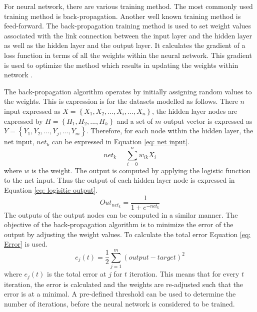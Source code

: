 \documentclass[11pt,twocolumn]{witseiepaper}
\begin{document}
	For neural network, there are various training method. The most commonly used training method is back-propagation. Another well known training method is feed-forward. The back-propagation training method is used to set weight values associated with the link connection between the input layer and the hidden layer as well as the hidden layer and the output layer. It calculates the gradient of a loss function in terms of all the weights within the neural network. This gradient is used to optimize the method which results in updating the weights within network \cite{Oukrich2016}.
	
	The back-propagation algorithm operates by initially assigning random values to the weights. This is expression is for the datasets modelled as follows. There $n$ input expressed as $X = \left\{X_1, X_2, ... , X_i, ..., X_n\right\}$, the hidden layer nodes are expressed by $H = \left\{H_1, H_2, ... , H_h\right\}$ and a set of $m$ output vector is expressed as $Y = \left\{Y_1, Y_2, ... , Y_j, ... , Y_m\right\}$. Therefore, for each node within the hidden layer, the net input, $net_{k}$ can be expressed in Equation \ref{eq: net input}.
	\begin{equation}
		\label{eq: net input}
		net_{k} = \sum_{i = 0}^{n} w_{ik} X_i
	\end{equation}
	where $w$ is the weight.
	\newline
	The output is computed by applying the logistic function to the net input. Thus the output of each hidden layer node is expressed in Equation \ref{eq: logisitic output}.
	\begin{equation}
		\label{eq: logisitic output}
		Out_{net_k} = \frac{1}{1 + e^{-net_k}}
	\end{equation}
	The outputs of the output nodes can be computed in a similar manner. The objective of the back-propagation algorithm is to minimize the error of the output by adjusting the weight values. To calculate the total error Equation \ref{eq: Error} is used.
	\begin{equation}
		\label{eq: Error}
		e_j(t) = \frac{1}{2} \sum_{j = 1}^{m} (output - target)^2
	\end{equation}
	where $e_j(t)$ is the total error at $j$ for $t$ iteration. 
	\newline
	This means that for every $t$ iteration, the error is calculated and the weights are re-adjusted such that the error is at a minimal. A pre-defined threshold can be used to determine the number of iterations, before the neural network is considered to be trained.
	
\end{document}
